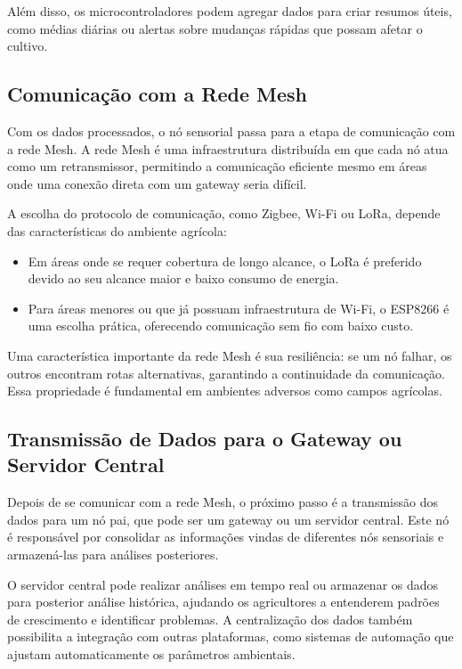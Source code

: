 Além disso, os microcontroladores podem agregar dados para criar resumos úteis, como médias diárias ou alertas sobre mudanças rápidas que possam afetar o cultivo.

\subsection{Comunicação com a Rede Mesh}

Com os dados processados, o nó sensorial passa para a etapa de comunicação com a rede Mesh. A rede Mesh é uma infraestrutura distribuída em que cada nó atua como um retransmissor, permitindo a comunicação eficiente mesmo em áreas onde uma conexão direta com um gateway seria difícil.

A escolha do protocolo de comunicação, como Zigbee, Wi-Fi ou LoRa, depende das características do ambiente agrícola:
\begin{itemize}
    \item Em áreas onde se requer cobertura de longo alcance, o LoRa é preferido devido ao seu alcance maior e baixo consumo de energia.
    \item Para áreas menores ou que já possuam infraestrutura de Wi-Fi, o ESP8266 é uma escolha prática, oferecendo comunicação sem fio com baixo custo.
\end{itemize}

Uma característica importante da rede Mesh é sua resiliência: se um nó falhar, os outros encontram rotas alternativas, garantindo a continuidade da comunicação. Essa propriedade é fundamental em ambientes adversos como campos agrícolas.

\subsection{Transmissão de Dados para o Gateway ou Servidor Central}

Depois de se comunicar com a rede Mesh, o próximo passo é a transmissão dos dados para um nó pai, que pode ser um gateway ou um servidor central. Este nó é responsável por consolidar as informações vindas de diferentes nós sensoriais e armazená-las para análises posteriores.

O servidor central pode realizar análises em tempo real ou armazenar os dados para posterior análise histórica, ajudando os agricultores a entenderem padrões de crescimento e identificar problemas. A centralização dos dados também possibilita a integração com outras plataformas, como sistemas de automação que ajustam automaticamente os parâmetros ambientais.

